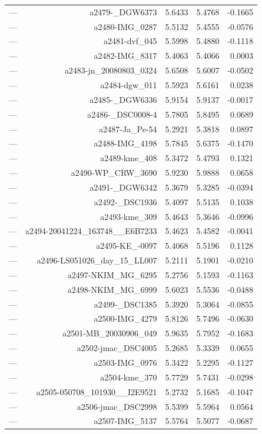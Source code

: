\begin{table}[htbp]
\begin{tabular}{lrrrr}
— & a2479-_DGW6373 & 5.6433 & 5.4768 & -0.1665 \\
— & a2480-IMG_0287 & 5.5132 & 5.4555 & -0.0576 \\
— & a2481-dvf_045 & 5.5998 & 5.4880 & -0.1118 \\
— & a2482-IMG_8317 & 5.4063 & 5.4066 & 0.0003 \\
— & a2483-jn_20080803_0324 & 5.6508 & 5.6007 & -0.0502 \\
— & a2484-dgw_011 & 5.5923 & 5.6161 & 0.0238 \\
— & a2485-_DGW6336 & 5.9154 & 5.9137 & -0.0017 \\
— & a2486-_DSC0008-4 & 5.7805 & 5.8495 & 0.0689 \\
— & a2487-Ja_Pe-54 & 5.2921 & 5.3818 & 0.0897 \\
— & a2488-IMG_4198 & 5.7845 & 5.6375 & -0.1470 \\
— & a2489-kme_408 & 5.3472 & 5.4793 & 0.1321 \\
— & a2490-WP_CRW_3690 & 5.9230 & 5.9888 & 0.0658 \\
— & a2491-_DGW6342 & 5.3679 & 5.3285 & -0.0394 \\
— & a2492-_DSC1936 & 5.4097 & 5.5135 & 0.1038 \\
— & a2493-kme_309 & 5.4643 & 5.3646 & -0.0996 \\
— & a2494-20041224_163748__E6B7233 & 5.4623 & 5.4582 & -0.0041 \\
— & a2495-KE_-0097 & 5.4068 & 5.5196 & 0.1128 \\
— & a2496-LS051026_day_15_LL007 & 5.2111 & 5.1901 & -0.0210 \\
— & a2497-NKIM_MG_6295 & 5.2756 & 5.1593 & -0.1163 \\
— & a2498-NKIM_MG_6999 & 5.6023 & 5.5536 & -0.0488 \\
— & a2499-_DSC1385 & 5.3920 & 5.3064 & -0.0855 \\
— & a2500-IMG_4279 & 5.8126 & 5.7496 & -0.0630 \\
— & a2501-MB_20030906_049 & 5.9635 & 5.7952 & -0.1683 \\
— & a2502-jmac_DSC4005 & 5.2685 & 5.3339 & 0.0655 \\
— & a2503-IMG_0976 & 5.3422 & 5.2295 & -0.1127 \\
— & a2504-kme_370 & 5.7729 & 5.7431 & -0.0298 \\
— & a2505-050708_101930__I2E9521 & 5.2732 & 5.1685 & -0.1047 \\
— & a2506-jmac_DSC2998 & 5.5399 & 5.5964 & 0.0564 \\
— & a2507-IMG_5137 & 5.5764 & 5.5077 & -0.0687 \\

\end{tabular}
\end{table}
